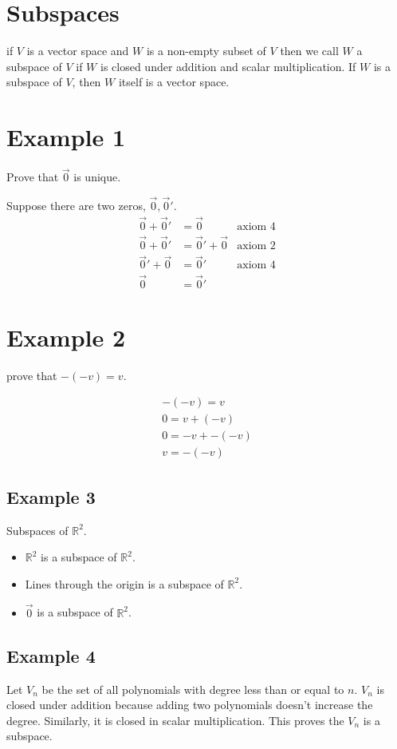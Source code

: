 \documentclass{article}
\theoremstyle{mytheoremstyle}
\theoremstyle{mytheoremstyle}
\theoremstyle{myproblemstyle}
\begin{document}
    \section*{Subspaces}
    if $V$ is a vector space and $W$ is a non-empty subset of $V$ then we call
    $W$ a subspace of $V$ if $W$ is closed under addition and scalar
    multiplication. If $W$ is a subspace of $V$, then $W$ itself is a vector
    space.

    \section*{Example 1}
    Prove that $\vec{0}$ is unique.

    Suppose there are two zeros, $\vec{0}, \vec{0}'$.
    \begin{align*}
        \vec{0} + \vec{0}' &= \vec{0} & \text{axiom 4} \\
        \vec{0} + \vec{0}' &= \vec{0}' + \vec{0} & \text{axiom 2} \\
        \vec{0}' + \vec{0} &= \vec{0}' & \text{axiom 4} \\
        \vec{0}       &= \vec{0}'
    \end{align*}

    \section*{Example 2}
    prove that $-(-v) = v$.

    \begin{align*}
        -(-v) = v \\
        0 = v + (-v) \\
        0 = -v + -(-v) \\
        v = -(-v)
    \end{align*}

    \subsection*{Example 3}
    Subspaces of $\mathbb{R}^2$.
    \begin{itemize}
        \item $\mathbb{R}^2$ is a subspace of $\mathbb{R}^2$.
        \item Lines through the origin is a subspace of $\mathbb{R}^2$.
        \item $\vec{0}$ is a subspace of $\mathbb{R}^2$.
    \end{itemize}

    \subsection*{Example 4}
    Let $V_n$ be the set of all polynomials with degree less than or equal to
    $n$. $V_n$ is closed under addition because adding two polynomials doesn't
    increase the degree. Similarly, it is closed in scalar multiplication. This
    proves the $V_n$ is a subspace.
\end{document}

